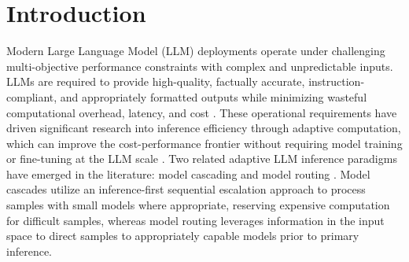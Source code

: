 \documentclass[sigconf]{acmart}
\begin{document}
\TODO
{}

\TODO
{}

\TODO
{}

\maketitle


\section{Introduction}

Modern Large Language Model (LLM) deployments operate under challenging multi-objective performance constraints with complex and unpredictable inputs. LLMs are required to provide high-quality, factually accurate, instruction-compliant, and appropriately formatted outputs while minimizing wasteful computational overhead, latency, and cost \cite{PLACEHOLDER:llm-deployment-constraints}. These operational requirements have driven significant research into inference efficiency through adaptive computation, which can improve the cost-performance frontier without requiring model training or fine-tuning at the LLM scale \cite{efficiencysurvey, moslem2026dynamicmodelroutingcascading}. Two related adaptive LLM inference paradigms have emerged in the literature: model cascading \cite{varshney-baral-2022-model} and model routing \cite{ding2024hybrid, ong2024routellmlearningroutellms, routerbench}. Model cascades utilize an inference-first sequential escalation approach to process samples with small models where appropriate, reserving expensive computation for difficult samples, whereas model routing leverages information in the input space to direct samples to appropriately capable models prior to primary inference.
 
\end{document}
